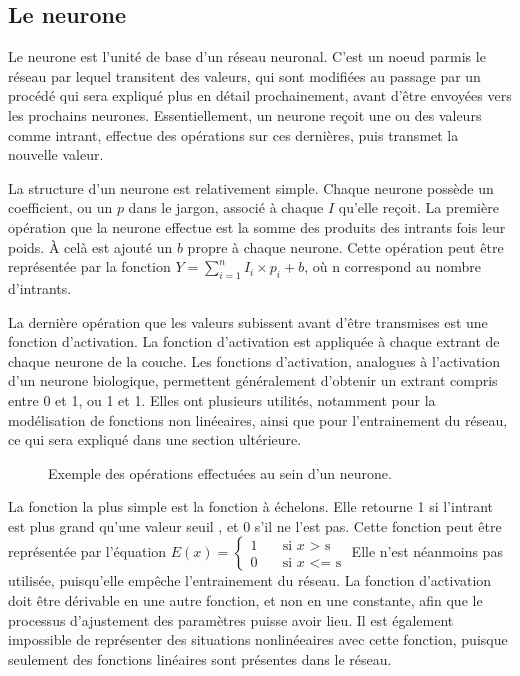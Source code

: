 \documentclass[letterpaper,10pt,french]{sphinxmanual}
\begin{document}
\subsection{Le neurone}
\label{\detokenize{notions_de_base:le-neurone}}
Le neurone est l’unité de base d’un réseau neuronal. C’est un noeud parmis le réseau par lequel transitent des valeurs, qui sont modifiées
au passage par un procédé qui sera expliqué plus en détail prochainement, avant d’être envoyées vers les prochains neurones.
Essentiellement, un neurone reçoit une ou des valeurs comme intrant, effectue des opérations sur ces dernières, puis transmet la nouvelle valeur.

La structure d’un neurone est relativement simple. Chaque neurone possède un coefficient, ou un  \(p\) dans le jargon, associé à chaque  \(I\) qu’elle reçoit.
La première opération que la neurone effectue est la somme des produits des intrants fois leur poids. À celà est ajouté un  \(b\) propre à chaque neurone.
Cette opération peut être représentée par la fonction \(Y = \sum_{i=1}^{n} I_i \times p_i + b\), où n correspond au nombre d’intrants.

La dernière opération que les valeurs subissent avant d’être transmises est une fonction d’activation. La fonction d’activation est appliquée à chaque extrant de chaque
neurone de la couche. Les fonctions d’activation, analogues à l’activation
d’un neurone biologique, permettent généralement d’obtenir un extrant compris entre 0 et 1, ou \sphinxhyphen{}1 et 1. Elles ont plusieurs utilités, notamment
pour la modélisation de fonctions non linéeaires, ainsi que pour l’entrainement du réseau, ce qui sera expliqué dans une section ultérieure.

\begin{figure}[htbp]
\centering
\capstart

\noindent{}
\caption{Exemple des opérations effectuées au sein d’un neurone.}\label{\detokenize{notions_de_base:neurone}}\end{figure}

La fonction la plus simple est la fonction à échelons. Elle retourne 1 si l’intrant  est plus grand qu’une valeur seuil , et 0 s’il ne l’est pas. Cette fonction peut être représentée par l’équation
\(
E(x)=
\begin{cases}
 1 & \quad \text{si } x \text{ > s}\\
 0 & \quad \text{si } x \text{ <= s}
\end{cases}
\)
Elle n’est néanmoins pas utilisée, puisqu’elle empêche l’entrainement du réseau.
La fonction d’activation doit être dérivable en une autre fonction, et non en une constante, afin que le processus d’ajustement des paramètres puisse avoir lieu.
Il est également impossible de représenter des situations non\sphinxhyphen{}linéeaires avec cette fonction, puisque seulement des fonctions linéaires sont présentes dans le réseau.
\end{document}
